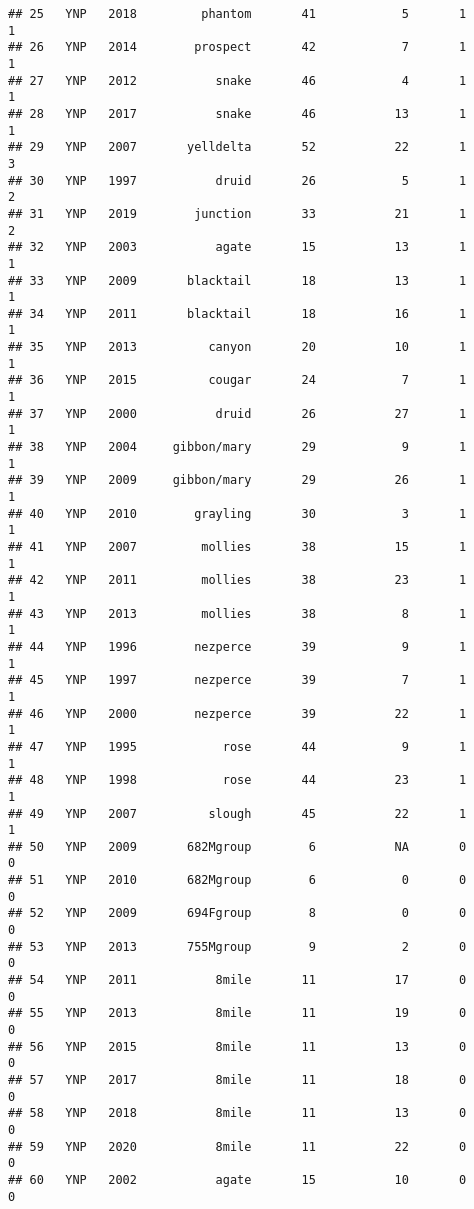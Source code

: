 \documentclass[
]{article}
\begin{document}
\begin{verbatim}
## 25   YNP   2018         phantom       41            5       1        1
## 26   YNP   2014        prospect       42            7       1        1
## 27   YNP   2012           snake       46            4       1        1
## 28   YNP   2017           snake       46           13       1        1
## 29   YNP   2007       yelldelta       52           22       1        3
## 30   YNP   1997           druid       26            5       1        2
## 31   YNP   2019        junction       33           21       1        2
## 32   YNP   2003           agate       15           13       1        1
## 33   YNP   2009       blacktail       18           13       1        1
## 34   YNP   2011       blacktail       18           16       1        1
## 35   YNP   2013          canyon       20           10       1        1
## 36   YNP   2015          cougar       24            7       1        1
## 37   YNP   2000           druid       26           27       1        1
## 38   YNP   2004     gibbon/mary       29            9       1        1
## 39   YNP   2009     gibbon/mary       29           26       1        1
## 40   YNP   2010        grayling       30            3       1        1
## 41   YNP   2007         mollies       38           15       1        1
## 42   YNP   2011         mollies       38           23       1        1
## 43   YNP   2013         mollies       38            8       1        1
## 44   YNP   1996        nezperce       39            9       1        1
## 45   YNP   1997        nezperce       39            7       1        1
## 46   YNP   2000        nezperce       39           22       1        1
## 47   YNP   1995            rose       44            9       1        1
## 48   YNP   1998            rose       44           23       1        1
## 49   YNP   2007          slough       45           22       1        1
## 50   YNP   2009       682Mgroup        6           NA       0        0
## 51   YNP   2010       682Mgroup        6            0       0        0
## 52   YNP   2009       694Fgroup        8            0       0        0
## 53   YNP   2013       755Mgroup        9            2       0        0
## 54   YNP   2011           8mile       11           17       0        0
## 55   YNP   2013           8mile       11           19       0        0
## 56   YNP   2015           8mile       11           13       0        0
## 57   YNP   2017           8mile       11           18       0        0
## 58   YNP   2018           8mile       11           13       0        0
## 59   YNP   2020           8mile       11           22       0        0
## 60   YNP   2002           agate       15           10       0        0

\end{verbatim}
\end{document}
